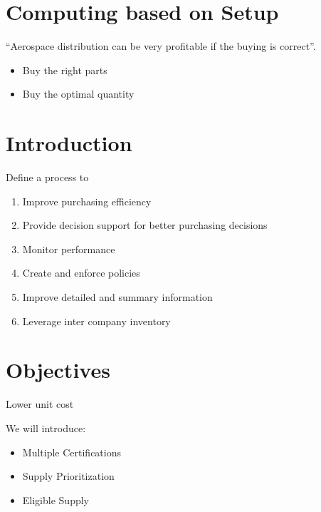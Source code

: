 \documentclass[letterpaper,10pt,english]{sphinxmanual}
\begin{document}
\chapter{Computing based on Setup}
\label{\detokenize{BusinessProcessReengineering:computing-based-on-setup}}
“Aerospace distribution can be very profitable if the buying is
correct”.
\begin{itemize}
\item {} 
Buy the right parts

\item {} 
Buy the optimal quantity

\end{itemize}


\chapter{Introduction}
\label{\detokenize{BusinessProcessReengineering:introduction}}
Define a process to
\begin{enumerate}
%
\item {} 
Improve purchasing efficiency

\item {} 
Provide decision support for better purchasing decisions

\item {} 
Monitor performance

\item {} 
Create and enforce policies

\item {} 
Improve detailed and summary information

\item {} 
Leverage inter company inventory

\end{enumerate}


\chapter{Objectives}
\label{\detokenize{BusinessProcessReengineering:id1}}
Lower unit cost

We will introduce:
\begin{itemize}
\item {} 
Multiple Certifications

\item {} 
Supply Prioritization

\item {} 
Eligible Supply

\end{itemize}
\end{document}
